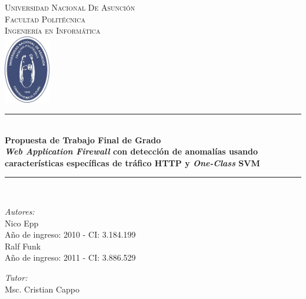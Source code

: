 \documentclass[oneside,11pt]{thesis}
\newcommand{\HRule}{
    \protect
    \rule{\linewidth}{0.3mm}
}
\begin{document}
    \begin{titlepage}
        \begin{center}
            \textsc{\LARGE Universidad Nacional De Asunción}        \\[1.5cm]
            \textsc{\LARGE Facultad Politécnica}                    \\[1.5cm]
            \textsc{\Large Ingeniería en Informática}               \\[1.5cm]
            \includegraphics[width=20mm]{images/Escudo_FPUNA.jpg}   \\[1.2cm]

            \HRule                                                  \\[0.4cm]
            {\bfseries
                Propuesta de Trabajo Final de Grado
            }                                                       \\[0.4cm]
            {\bfseries
                \textit{Web Application Firewall}
                con detección de anomalías
                usando características específicas de tráfico HTTP
                y \textit{One-Class} SVM
            }                                                       \\[0.4cm]
            \HRule                                                  \\[1.0cm]

            \begin{minipage}[t]{0.4\textwidth}
                \begin{flushleft}
                    \large
                    \emph{Autores:}                                 \\[0.2cm]
                    Nico Epp                                        \\
                    {\small Año de ingreso: 2010 - CI: 3.184.199}   \\
                    Ralf Funk                                       \\
                    {\small Año de ingreso: 2011 - CI: 3.886.529}
                \end{flushleft}
            \end{minipage}
            \begin{minipage}[t]{0.4\textwidth}
                \begin{flushright}
                    \large
                    \emph{Tutor:}                                   \\[0.2cm]
                    Msc. Cristian Cappo
                \end{flushright}
            \end{minipage}


\end{center}
\end{titlepage}
\end{document}
